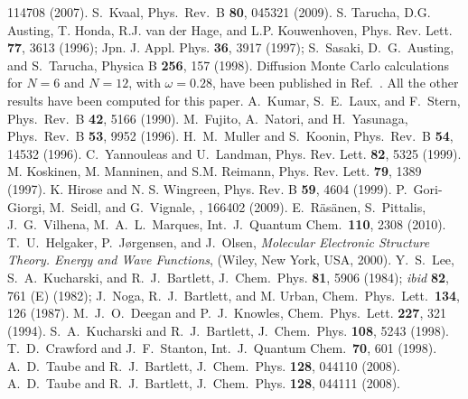 \begin{thebibliography}{200}
114708 (2007).
 S.~Kvaal, Phys.~Rev.~B {\bf 80}, 045321 (2009).
 S. Tarucha, D.G. Austing, T. Honda, R.J. van der Hage, and L.P. Kouwenhoven,
Phys. Rev. Lett. {\bf 77}, 3613 (1996); Jpn. J. Appl. Phys. {\bf 36}, 3917 (1997);
S.~Sasaki, D.~G.~Austing, and S.~Tarucha, Physica B {\bf 256}, 157 (1998).
Diffusion Monte Carlo  
calculations for $N=6$ and $N=12$, with $\omega=0.28$,
have been published in Ref.~. All the other 
results have been computed for this paper.
 A.~Kumar, S.~E.~Laux, and F.~Stern, Phys.~Rev.~B {\bf 42}, 5166 (1990).
 M.~Fujito, A.~Natori, and H.~Yasunaga, Phys.~Rev.~B {\bf 53}, 9952 (1996).
 H.~M.~Muller and S.~Koonin, Phys.~Rev.~B {\bf 54}, 14532 (1996).
 C.~Yannouleas and U.~Landman, Phys. Rev. Lett. {\bf 82}, 5325 (1999).
 M. Koskinen, M. Manninen, and S.M. Reimann, Phys. Rev. Lett. {\bf 79}, 1389 (1997).
 K. Hirose and N. S. Wingreen, Phys. Rev. B {\bf 59}, 4604 (1999).
 P.~Gori-Giorgi, M.~Seidl, and G.~Vignale, , 166402 (2009).
 E.~R\"as\"anen, S.~Pittalis, J.~G.~Vilhena, M.~A.~L.~Marques, Int.~J.~Quantum Chem.~{\bf 110}, 2308 (2010). 
 T.~U.~Helgaker, P.~J{\o}rgensen, and J.~Olsen,
  \emph{Molecular Electronic Structure Theory. Energy and Wave Functions}, (Wiley, New York, USA, 2000).
 Y.~S.~Lee, S.~A.~Kucharski, and R.~J.~Bartlett, 
J.~Chem.~Phys. {\bf 81}, 5906 (1984); {\it ibid} {\bf 82}, 761 (E) (1982);
J.~Noga, R.~J.~Bartlett, and M. Urban, Chem.~Phys.~Lett.~{\bf 134}, 126 (1987).
 M.~J.~O.~Deegan and P.~J.~Knowles, Chem.~Phys.~Lett. \textbf{227}, 321 (1994).
 S.~A.~Kucharski and R.~J.~Bartlett, J.~Chem.~Phys. \textbf{108}, 5243 (1998).
 T.~D.~Crawford and J.~F.~Stanton, Int.~J.~Quantum Chem.~{\bf 70}, 601 (1998).
 A.~D.~Taube and R.~J.~Bartlett, J.~Chem.~Phys. \textbf{128}, 044110 (2008).
 A.~D.~Taube and R.~J.~Bartlett, J.~Chem.~Phys. {\bf 128}, 044111 (2008).


\end{thebibliography}
